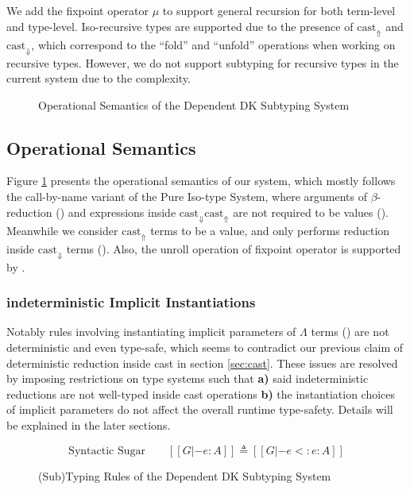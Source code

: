 \documentclass{llncs}
\newcommand{\castup}[0]{\mathrm{cast}_\Uparrow}
\newcommand{\castdn}[0]{\mathrm{cast}_\Downarrow}
\newcommand{\system}[0]{the Dependent DK Subtyping System }
\begin{document}
We add the fixpoint operator $\mu$ to support general recursion for both term-level
and type-level. Iso-recursive types are supported due to the presence of $\castup$
and $\castdn$, which correspond to the ``fold'' and ``unfold'' operations when
working on recursive types. However, we do not support subtyping for recursive
types in the current system due to the complexity.

\begin{figure}
    \centering


    \caption{Operational Semantics of \system}
    \label{fig:semantics}
\end{figure}

\subsection{Operational Semantics}

Figure \ref{fig:semantics} presents the operational semantics of our system,
which mostly follows the call-by-name variant of the Pure Iso-type System\cite{yang2019pure},
where arguments of $\beta$-reduction () and expressions inside $\castdn \castup$
are not required to be values (). Meanwhile we consider $\castup$ terms to be a value,
and only performs reduction inside $\castdn$ terms (). Also, the unroll
operation of fixpoint operator is supported by .

\subsubsection{indeterministic Implicit Instantiations}

Notably rules involving instantiating implicit parameters of $\Lambda$ terms
() are not deterministic and even type-safe, which seems to
contradict our previous claim of deterministic reduction inside cast in section \ref{sec:cast}.
These issues are resolved by imposing restrictions on type systems such that
\textbf{a)} said indeterministic reductions are not well-typed inside cast operations
\textbf{b)} the instantiation choices of implicit parameters do not affect the
overall runtime type-safety.
Details will be explained in the later sections.

\begin{figure}
    \centering

    \begin{equation*}
       \text{Syntactic Sugar} \qquad [[G |- e : A]] \triangleq [[G |- e <: e : A]]
    \end{equation*}
    \caption{(Sub)Typing Rules of \system}
    \label{fig:typing}
\end{figure}
\end{document}
